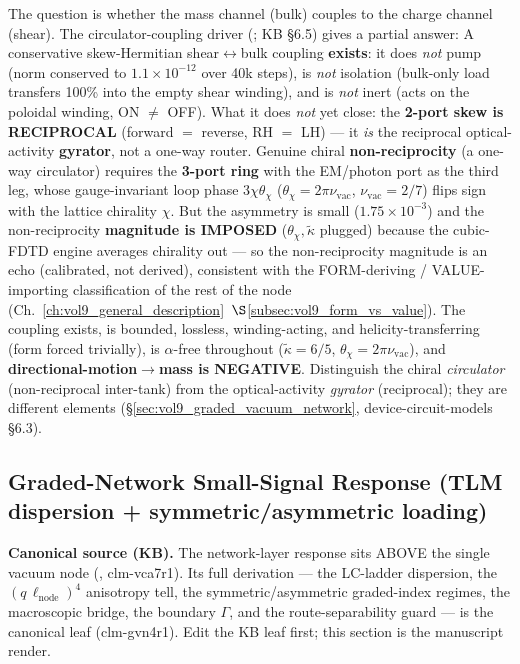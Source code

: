 \noindent The question is whether the mass channel (bulk) couples to the charge channel (shear). The circulator-coupling driver (\texttt{}; KB  \S6.5) gives a partial answer: A conservative skew-Hermitian shear$\leftrightarrow$bulk coupling \textbf{exists}: it does \emph{not} pump (norm conserved to $1.1\times10^{-12}$ over 40k steps), is \emph{not} isolation (bulk-only load transfers 100\% into the empty shear winding), and is \emph{not} inert (acts on the poloidal winding, ON $\ne$ OFF). What it does \emph{not} yet close: the \textbf{2-port skew is RECIPROCAL} (forward $=$ reverse, RH $=$ LH) --- it \emph{is} the reciprocal optical-activity \textbf{gyrator}, not a one-way router. Genuine chiral \textbf{non-reciprocity} (a one-way circulator) requires the \textbf{3-port ring} with the EM/photon port as the third leg, whose gauge-invariant loop phase $3\chi\theta_\chi$ ($\theta_\chi = 2\pi\nu_{\mathrm{vac}}$, $\nu_{\mathrm{vac}}=2/7$) flips sign with the lattice chirality $\chi$. But the asymmetry is small ($1.75\times10^{-3}$) and the non-reciprocity \textbf{magnitude is IMPOSED} ($\theta_\chi, \tilde\kappa$ plugged) because the cubic-FDTD engine averages chirality out --- so the non-reciprocity magnitude is an echo (calibrated, not derived), consistent with the FORM-deriving / VALUE-importing classification of the rest of the node (Ch.~\ref{ch:vol9_general_description}~$\S$\ref{subsec:vol9_form_vs_value}). The coupling exists, is bounded, lossless, winding-acting, and helicity-transferring (form forced trivially), is $\alpha$-free throughout ($\tilde\kappa = 6/5$, $\theta_\chi = 2\pi\nu_{\mathrm{vac}}$), and \textbf{directional-motion$\to$mass is NEGATIVE}. Distinguish the chiral \emph{circulator} (non-reciprocal inter-tank) from the optical-activity \emph{gyrator} (reciprocal); they are different elements (\S\ref{sec:vol9_graded_vacuum_network}, device-circuit-models \S6.3).



\subsection{Graded-Network Small-Signal Response (TLM dispersion + symmetric/asymmetric loading)}
\label{sec:vol9_graded_network_response}

\noindent\textbf{Canonical source (KB).} The network-layer response sits ABOVE the single vacuum node (, clm-vca7r1). Its full derivation --- the LC-ladder dispersion, the $(q\,\ell_{\mathrm{node}})^4$ anisotropy tell, the symmetric/asymmetric graded-index regimes, the macroscopic bridge, the boundary $\Gamma$, and the route-separability guard --- is the canonical leaf  (clm-gvn4r1). Edit the KB leaf first; this section is the manuscript render.

